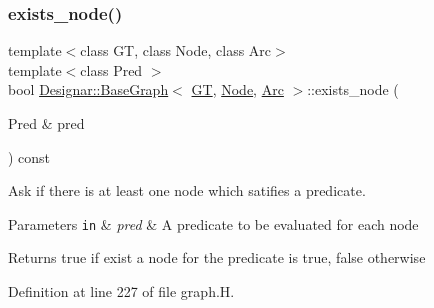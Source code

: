 \subsubsection{\texorpdfstring{exists\+\_\+node()}{exists\_node()}\hspace{0.1cm}{\footnotesize\ttfamily [1/2]}}
{\footnotesize\ttfamily template$<$class GT, class Node, class Arc$>$ \\
template$<$class Pred $>$ \\
bool \hyperlink{class_designar_1_1_base_graph}{Designar\+::\+Base\+Graph}$<$ \hyperlink{demo-buildgraph_8_c_a3001c40d2c31ca87ed96cd7d1334a55e}{GT}, \hyperlink{namespace_designar_a5af326c65aa2bd26b26c410f2030d09e}{Node}, \hyperlink{namespace_designar_a3f55fb5513d62ff47cbc8f72b8e95d6f}{Arc} $>$\+::exists\+\_\+node (\begin{DoxyParamCaption}\item[{Pred \&}]{pred }\end{DoxyParamCaption}) const\hspace{0.3cm}{\ttfamily [inline]}}



Ask if there is at least one node which satifies a predicate. 


\begin{DoxyParams}[1]{Parameters}
\mbox{\tt in}  & {\em pred} & A predicate to be evaluated for each node \\
\hline
\end{DoxyParams}
\begin{DoxyReturn}{Returns}
{\ttfamily true} if exist a node for the predicate is true, {\ttfamily false} otherwise 
\end{DoxyReturn}


Definition at line 227 of file graph.\+H.

\mbox{\label{class_designar_1_1_base_graph_a62df2c7ec71d2b009e96f8974968a3fc}} 
